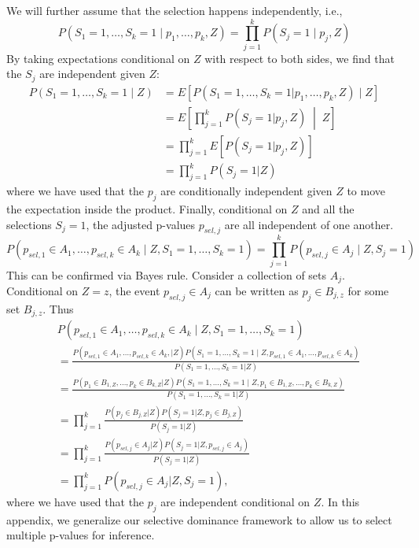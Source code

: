 \documentclass{article}
\begin{document}
\begin{appendix}
We will further assume that the selection happens independently, i.e., 
\begin{equation*}
    P(S_1 = 1, \dots, S_k = 1 \mid p_1, \dots, p_k, Z) = \prod_{j = 1}^k P(S_j = 1 \mid p_j, Z)
\end{equation*} 
By taking expectations conditional on $Z$ with respect to both sides, we find that the $S_j$ are independent given $Z$:
\begin{align*}
    P(S_1 = 1, \dots, S_k = 1 \mid Z) &= E[P(S_1 = 1, \dots, S_k = 1 | p_1, \dots, p_k, Z) \mid Z] \\
    &= E \left[\prod_{j = 1}^k P(S_j = 1 | p_j, Z) \;\middle|\; Z\right]\\
    &= \prod_{j=1}^k E[P(S_j = 1 | p_j, Z)]\\
    &= \prod_{j=1}^k P(S_j = 1 | Z)
\end{align*}
where we have used that the $p_j$ are conditionally independent given $Z$ to move the expectation inside the product. Finally, conditional on $Z$ and all the selections $S_j=1$, the adjusted p-values $p_{sel, j}$ are all independent of one another. 
\begin{equation*}
    P(p_{sel, 1} \in A_1, \dots, p_{sel, k} \in A_k \mid Z, S_1 = 1, \dots, S_k = 1) = \prod_{j=1}^k P(p_{sel, j} \in A_j \mid Z, S_j = 1)
\end{equation*}
This can be confirmed via Bayes rule. Consider a collection of sets $A_j$. Conditional on $Z=z$, the event $p_{sel, j} \in A_j$ can be written as $p_j \in B_{j, z}$ for some set $B_{j, z}$. Thus
\begin{align*}
    &P(p_{sel, 1} \in A_1, \dots, p_{sel, k} \in A_k \mid Z, S_1 = 1, \dots, S_k = 1) \\
    &= \frac{P(p_{sel, 1} \in A_1, \dots, p_{sel, k} \in A_k, | Z) P( S_1 = 1, \dots, S_k = 1 \mid Z, p_{sel, 1} \in A_1, \dots, p_{sel, k} \in A_k)  }{P(S_1=1, \dots, S_k = 1 | Z)}\\
    &= \frac{P(p_{1} \in B_{1, Z}, \dots, p_{k} \in B_{k, Z} | Z) P( S_1 = 1, \dots, S_k = 1 \mid Z, p_{1} \in B_{1, Z}, \dots, p_{k} \in B_{k, Z})  }{P(S_1=1, \dots, S_k = 1 | Z)}\\
    &= \prod_{j=1}^k \frac{ P(p_j \in B_{j, Z} |Z) P(S_j = 1 | Z, p_j \in B_{j, Z})}{P(S_j = 1 | Z) }\\
    &= \prod_{j=1}^k \frac{ P(p_{sel, j} \in A_j |Z) P(S_j = 1 | Z, p_{sel, j} \in A_j)}{P(S_j = 1 | Z) }\\
    &= \prod_{j = 1}^k P(p_{sel, j} \in A_j | Z, S_j=1),
\end{align*}
where we have used that the $p_j$ are independent conditional on $Z$.
\fi 
\iffalse 
In this appendix, we generalize our selective dominance framework to allow us to select multiple p-values for inference. 


\end{appendix}
\end{document}
